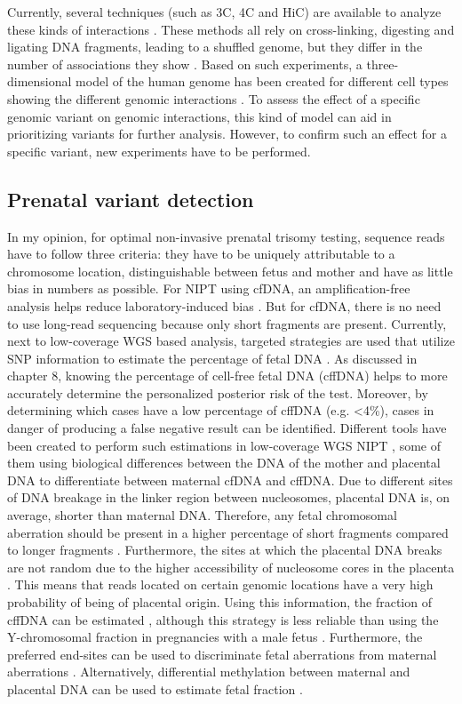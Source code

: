 Currently, several techniques (such as 3C, 4C and HiC) are available to analyze these kinds of interactions \cite{Spielmann_2018}. 
These methods all rely on cross-linking, digesting and ligating DNA fragments, leading to a shuffled genome, but they differ in the number of associations they show \cite{de_Wit_2012}. Based on such experiments, a three-dimensional model of the human genome has been created for different cell types showing the different genomic interactions \cite{Wang_2018}. 
To assess the effect of a specific genomic variant on genomic interactions, this kind of model can aid in prioritizing variants for further analysis. 
However, to confirm such an effect for a specific variant, new experiments have to be performed.

\subsection{Prenatal variant detection}
In my opinion, for optimal non-invasive prenatal trisomy testing, sequence reads have to follow three criteria: they have to be uniquely attributable to a chromosome location, distinguishable between
fetus and mother and have as little bias in numbers as possible. 
For NIPT using cfDNA, an amplification-free analysis helps reduce laboratory-induced bias \cite{van_den_Oever_2012,van_den_Oever_2013}. 
But for cfDNA, there is no need to use long-read sequencing because only short fragments are present. 
Currently, next to low-coverage WGS based analysis, targeted strategies are used that utilize SNP information to estimate the percentage of fetal DNA \cite{Stokowski_2015,Brady_2015}. 
As discussed in chapter 8, knowing the percentage of cell-free fetal DNA (cffDNA) helps to more accurately determine the personalized posterior risk of the test. 
Moreover, by determining which cases have a low percentage of cffDNA (e.g. \textless4\%), cases in danger of producing a false negative result can be identified. 
Different tools have been created to perform such estimations in low-coverage WGS NIPT \cite{Peng_2017}, some of them using biological differences between the DNA of the mother and placental DNA to differentiate between maternal cfDNA and cffDNA. Due to different sites of DNA breakage in the linker region between nucleosomes, placental DNA is, on average, shorter than maternal DNA. 
Therefore, any fetal chromosomal aberration should be present in a higher percentage of short fragments compared to longer fragments \cite{Yu_2014b,Yu_2016}. 
Furthermore, the sites at which the placental DNA breaks are not random due to the higher accessibility of nucleosome cores in the placenta \cite{Sun_2018a}. 
This means that reads located on certain genomic locations have a very high probability of being of placental origin. 
Using this information, the fraction of cffDNA can be estimated \cite{Straver_2016}, although this strategy is less reliable than using the Y-chromosomal fraction in pregnancies with a male fetus \cite{van_Beek_2017}. 
Furthermore, the preferred end-sites can be used to discriminate fetal aberrations from maternal aberrations \cite{Sun_2018a}. 
Alternatively, differential methylation between maternal and placental DNA can be used to estimate fetal fraction \cite{Nygren_2010}.

